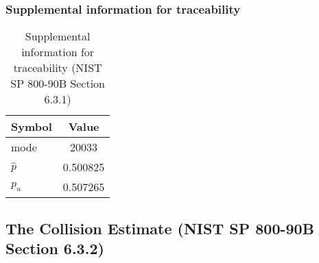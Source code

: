 \documentclass[a3paper,xelatex,english]{bxjsarticle}
\begin{document}
\subsubsection{Supplemental information for traceability}
\renewcommand{\arraystretch}{1.8}
\begin{table}[h]
\caption{Supplemental information for traceability (NIST SP 800-90B Section 6.3.1)}
\begin{center}
\begin{tabular}{|l|c|}
\hline 
\rowcolor{anotherlightblue} %
Symbol				& Value \\ \hline 
mode				&    20033\\ \hline 
$\hat{p}$ 			& 0.500825\\ \hline
$p_u$				& 0.507265\\ \hline
\end{tabular}
\end{center}
\end{table}
\renewcommand{\arraystretch}{1.4}
\clearpage
\subsection{The Collision Estimate (NIST SP 800-90B Section 6.3.2)}\label{sec:Binary632}
\end{document}
